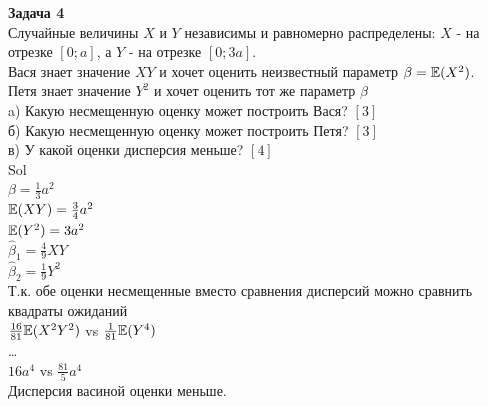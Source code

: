 \documentclass[12pt, a4paper]{article}\usepackage[]{graphicx}\usepackage[]{color}
\begin{document}
\textbf{Задача 4} \\
Случайные величины $X$ и $Y$ независимы и равномерно распределены: $X$ - на отрезке $[0;a]$, а $Y$ - на отрезке $[0;3a]$. \\
Вася знает значение $XY$ и хочет оценить неизвестный параметр $\beta=\mathbb{E}(X^{2})$. \\
Петя знает значение $Y^2$ и хочет оценить тот же параметр $\beta$ \\
a) Какую несмещенную оценку может построить Вася? $[3]$ \\
б) Какую несмещенную оценку может построить Петя? $[3]$ \\
в) У какой оценки дисперсия меньше? $[4]$ \\
Sol \\
$\beta=\frac{1}{3}a^{2}$ \\
$\mathbb{E}(XY)=\frac{3}{4}a^{2}$ \\
$\mathbb{E}(Y^{2})=3a^{2}$\\
$\hat{\beta}_{1}=\frac{4}{9}XY$ \\
$\hat{\beta}_{2}=\frac{1}{9}Y^{2}$ \\
Т.к. обе оценки несмещенные вместо сравнения дисперсий можно сравнить квадраты ожиданий \\
$\frac{16}{81}\mathbb{E}(X^{2}Y^{2})$ vs $\frac{1}{81}\mathbb{E}(Y^{4})$ \\
\ldots \\
$16 a^4$ vs $\frac{81}{5} a^{4}$ \\
Дисперсия васиной оценки меньше. \\





\end{document}
